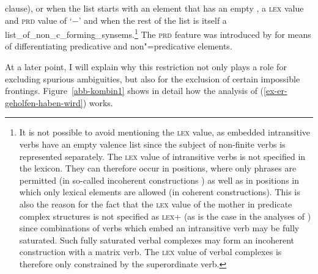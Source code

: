 clause), or when the list starts with an element that has an empty \compsl, a \textsc{lex} value and
\textsc{prd} value of `$-$' and when the rest of the list  is itself a list\_of\_non\_c\_forming\_synsems.\footnote{%
		It is not possible to avoid mentioning the \textsc{lex} value, as embedded intransitive verbs have
		an empty valence list since the subject of non-finite verbs is represented separately. The \textsc{lex} value of
		intransitive verbs is not specified in the lexicon. They can therefore occur in positions, 
		where only phrases are permitted (in so-called incoherent constructions \citep{Bech55a}) as
		well as in positions in which only lexical elements are allowed (in coherent constructions). 
		This is also the reason for the fact that the \textsc{lex} value of the mother in predicate complex
		structures is not specified as \textsc{lex}+ (as is the case in the analyses of \citealp{HN94a,dKM2001a}) since combinations
		of verbs which embed an intransitive verb may be fully saturated. Such fully
                saturated verbal complexes may form an incoherent construction with a matrix
                verb. The \textsc{lex} value of verbal complexes is therefore only constrained by the superordinate verb.%
}
The \textsc{prd} feature was introduced by \citet[--67]{ps} for means of differentiating predicative and non"=predicative
elements.

At a later point, I will explain why this restriction not only plays a role for excluding spurious
ambiguities, but also for the exclusion of certain impossible frontings.
Figure~\vref{abb-kombin1} shows in detail how the analysis of (\ref{ex-er-geholfen-haben-wird}) works.

